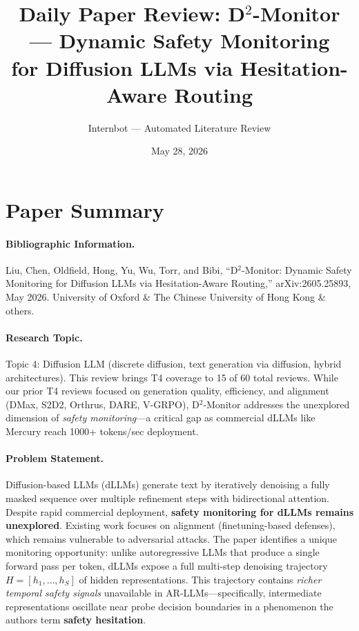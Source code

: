 \documentclass[11pt,a4paper]{article}
\title{Daily Paper Review: D$^2$-Monitor --- Dynamic Safety Monitoring\\for Diffusion LLMs via Hesitation-Aware Routing}
\author{Internbot --- Automated Literature Review}
\date{May 28, 2026}
\begin{document}
\maketitle

\section*{Paper Summary}

\paragraph{Bibliographic Information.}
Liu, Chen, Oldfield, Hong, Yu, Wu, Torr, and Bibi, ``D$^2$-Monitor: Dynamic Safety Monitoring for Diffusion LLMs via Hesitation-Aware Routing,'' arXiv:2605.25893, May 2026. University of Oxford \& The Chinese University of Hong Kong \& others.

\paragraph{Research Topic.}
Topic 4: Diffusion LLM (discrete diffusion, text generation via diffusion, hybrid architectures). This review brings T4 coverage to 15 of 60 total reviews. While our prior T4 reviews focused on generation quality, efficiency, and alignment (DMax, S2D2, Orthrus, DARE, V-GRPO), D$^2$-Monitor addresses the unexplored dimension of \emph{safety monitoring}---a critical gap as commercial dLLMs like Mercury reach 1000+ tokens/sec deployment.

\paragraph{Problem Statement.}
Diffusion-based LLMs (dLLMs) generate text by iteratively denoising a fully masked sequence over multiple refinement steps with bidirectional attention. Despite rapid commercial deployment, \textbf{safety monitoring for dLLMs remains unexplored}. Existing work focuses on alignment (finetuning-based defenses), which remains vulnerable to adversarial attacks. The paper identifies a unique monitoring opportunity: unlike autoregressive LLMs that produce a single forward pass per token, dLLMs expose a full multi-step denoising trajectory $H = [h_1, \ldots, h_S]$ of hidden representations. This trajectory contains \emph{richer temporal safety signals} unavailable in AR-LLMs---specifically, intermediate representations oscillate near probe decision boundaries in a phenomenon the authors term \textbf{safety hesitation}.
\end{document}
